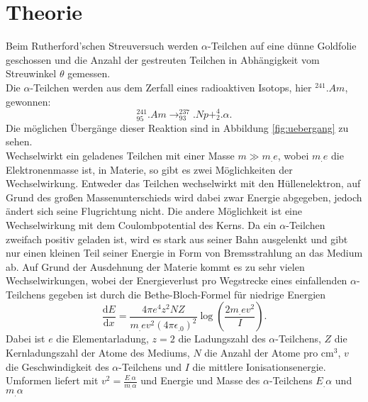 \section{Theorie}
\label{sec:Theorie}

Beim Rutherford'schen Streuversuch werden $\alpha$-Teilchen auf eine dünne Goldfolie geschossen und die Anzahl der gestreuten Teilchen in Abhängigkeit vom Streuwinkel $\theta$ gemessen.\\
Die $\alpha$-Teilchen werden aus dem Zerfall eines radioaktiven Isotops, hier $^{241}.{Am}$, gewonnen:
\[
^{241}_{95}.{Am}\rightarrow ^{237}_{93}.{Np} + ^{4}_{2}.{\alpha}\text{.}
\]
Die möglichen Übergänge dieser Reaktion sind in Abbildung \ref{fig:uebergang} zu sehen.\\
\noindent Wechselwirkt ein geladenes Teilchen mit einer Masse $m\gg m_.e$, wobei $m_.e$ die Elektronenmasse ist, in Materie, so gibt es zwei Möglichkeiten der Wechselwirkung.
Entweder das Teilchen wechselwirkt mit den Hüllenelektron, auf Grund des großen Massenunterschieds wird dabei zwar Energie abgegeben, jedoch ändert sich seine Flugrichtung nicht. Die andere Möglichkeit ist eine Wechselwirkung mit dem Coulombpotential des Kerns. Da ein $\alpha$-Teilchen zweifach positiv geladen ist, wird es stark aus seiner Bahn ausgelenkt und gibt nur einen kleinen Teil seiner Energie in Form von Bremsstrahlung an das Medium ab.
Auf Grund der Ausdehnung der Materie kommt es zu sehr vielen Wechselwirkungen, wobei der Energieverlust pro Wegstrecke eines einfallenden $\alpha$-Teilchens gegeben ist durch die Bethe-Bloch-Formel für niedrige Energien
\begin{equation}
\frac{\mathrm{d}E}{\mathrm{d}x}=\frac{4\pi e^4z^2N Z}{m_.ev^2(4\pi\epsilon_.0)^2}\log{\left(\frac{2m_.ev^2}{I}\right)}\text{.}\label{eq:BBF}
\end{equation} 
Dabei ist $e$ die Elementarladung, $z=2$ die Ladungszahl des $\alpha$-Teilchens, $Z$ die Kernladungszahl der Atome des Mediums, $N$ die Anzahl der Atome pro $\si{\centi\meter^3}$, $v$ die Geschwindigkeit des $\alpha$-Teilchens und $I$ die mittlere Ionisationsenergie.
Umformen liefert mit $v^2=\frac{E_.{\alpha}}{m_.{\alpha}}$ und Energie und Masse des $\alpha$-Teilchens $E_.{\alpha}$ und $m_.{\alpha}$
